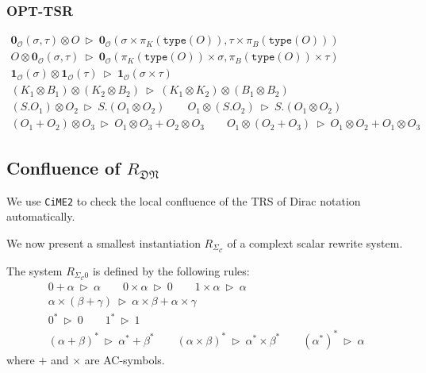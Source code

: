 \documentclass[manuscript, review, timestamp]{acmart}
\newcommand*{\type}{\texttt{type}}
\newcommand*{\reduce}{\ \triangleright\ }
\begin{document}
\subsubsection*{\textsf{OPT-TSR}}
\begin{gather*}
  \mathbf{0}_\mathcal{O}(\sigma, \tau) \otimes O \reduce \mathbf{0}_\mathcal{O}(\sigma \times \pi_K(\type(O)), \tau \times \pi_B(\type(O)))
  \\
  O \otimes \mathbf{0}_\mathcal{O}(\sigma, \tau) \reduce \mathbf{0}_\mathcal{O}(\pi_K(\type(O)) \times \sigma, \pi_B(\type(O)) \times \tau) \\
  \mathbf{1}_\mathcal{O}(\sigma) \otimes \mathbf{1}_\mathcal{O}(\tau) \reduce \mathbf{1}_\mathcal{O}(\sigma \times \tau) \\
  (K_1 \otimes B_1) \otimes (K_2 \otimes B_2) \reduce (K_1 \otimes K_2) \otimes (B_1 \otimes B_2) \\
  (S.O_1) \otimes O_2 \reduce S.(O_1 \otimes O_2)
  \qquad
  O_1 \otimes (S.O_2) \reduce S.(O_1 \otimes O_2) \\
  (O_1 + O_2) \otimes O_3 \reduce O_1 \otimes O_3 + O_2 \otimes O_3
  \qquad
  O_1 \otimes (O_2 + O_3) \reduce O_1 \otimes O_2 + O_1 \otimes O_3
\end{gather*}


\subsection{Confluence of $R_\mathfrak{DN}$}

We use \texttt{CiME2} to check the local confluence of the TRS of Dirac notation automatically.

We now present a smallest instantiation $R_{\Sigma_\mathcal{C}}$ of a complext scalar rewrite system. 

\begin{definition}
  The system $R_{\Sigma_\mathcal{C}0}$ is defined by the following rules:
  \begin{gather*}
    0 + \alpha \reduce \alpha
    \qquad
    0 \times \alpha \reduce 0
    \qquad
    1 \times \alpha \reduce \alpha \\
    \alpha \times (\beta + \gamma) \reduce \alpha \times \beta + \alpha \times \gamma \\
    0^* \reduce 0
    \qquad
    1^* \reduce 1 \\
    (\alpha + \beta)^* \reduce \alpha^* + \beta^*
    \qquad
    (\alpha \times \beta)^* \reduce \alpha^* \times \beta^*
    \qquad
    (\alpha^*)^* \reduce \alpha
  \end{gather*}
  where $+$ and $\times$ are AC-symbols.
\end{definition}
\end{document}
